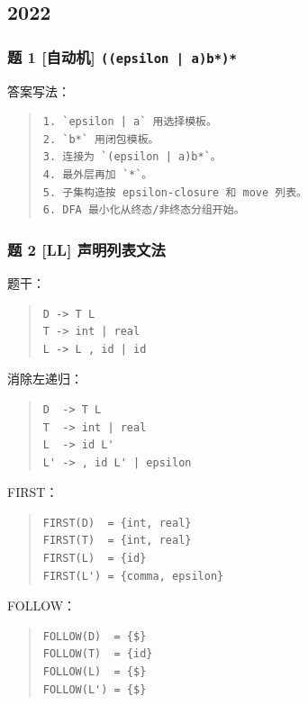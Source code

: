 \documentclass[UTF8,zihao=-4]{ctexart}
\begin{document}
\subsection{2022}


\subsubsection{题 1 [自动机] \texttt{((epsilon | a)b*)*}}


答案写法：


\begin{quote}
\footnotesize
\begin{verbatim}
1. `epsilon | a` 用选择模板。
2. `b*` 用闭包模板。
3. 连接为 `(epsilon | a)b*`。
4. 最外层再加 `*`。
5. 子集构造按 epsilon-closure 和 move 列表。
6. DFA 最小化从终态/非终态分组开始。
\end{verbatim}
\end{quote}


\subsubsection{题 2 [LL] 声明列表文法}


题干：


\begin{quote}
\footnotesize
\begin{verbatim}
D -> T L
T -> int | real
L -> L , id | id
\end{verbatim}
\end{quote}


消除左递归：


\begin{quote}
\footnotesize
\begin{verbatim}
D  -> T L
T  -> int | real
L  -> id L'
L' -> , id L' | epsilon
\end{verbatim}
\end{quote}


FIRST：


\begin{quote}
\footnotesize
\begin{verbatim}
FIRST(D)  = {int, real}
FIRST(T)  = {int, real}
FIRST(L)  = {id}
FIRST(L') = {comma, epsilon}
\end{verbatim}
\end{quote}


FOLLOW：


\begin{quote}
\footnotesize
\begin{verbatim}
FOLLOW(D)  = {$}
FOLLOW(T)  = {id}
FOLLOW(L)  = {$}
FOLLOW(L') = {$}
\end{verbatim}
\end{quote}
\end{document}
